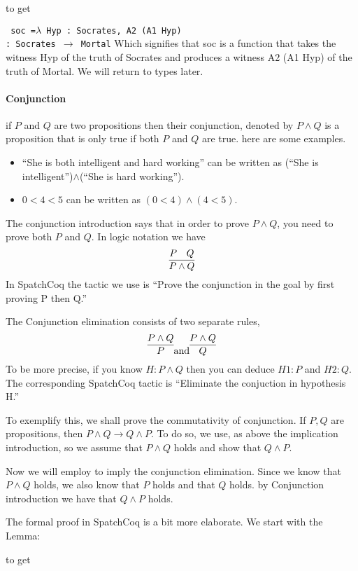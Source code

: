 to get 

\texttt{
soc =$ \lambda$ Hyp : Socrates, A2 (A1 Hyp) \\
     : Socrates $\rightarrow$ Mortal}
 Which signifies that soc is a function  that takes the witness Hyp of the truth of Socrates and produces a witness A2 (A1 Hyp) of the truth of Mortal.
 We will return to types later.



\paragraph{\bf Conjunction}
if $P$ and $Q$ are two propositions then their conjunction, denoted by $P\land Q$ is a proposition that is only true if both $P$ and $Q$ are true. here are some examples.

\begin{itemize}
\item ``She is both intelligent and hard working'' can be written as (``She is intelligent'')$\land$(``She is hard working'').
\item $0<4<5$ can be written as $(0<4)\land (4<5)$.
\end{itemize}


The conjunction introduction says that in order to prove $P\land Q$, you need to prove both $P$ and $Q$. In logic notation we have
$$\infer{P\land Q}{P & Q}$$
In SpatchCoq the tactic we use is ``Prove the conjunction in the goal by first proving P then Q.''

The Conjunction elimination consists of  two separate rules,
$$\infer{P}{P\land Q} \mbox{and} \infer{Q}{P\land Q}$$ To be more precise, if you know $H:P\land Q$ then you can deduce $H1:P$ and $H2:Q$. The corresponding SpatchCoq tactic is ``Eliminate the conjuction in hypothesis H.''

To exemplify this, we shall prove the commutativity of conjunction.
If $P,Q$ are propositions, then $P\land Q \rightarrow Q \land P$. To do so, we use, as above the implication introduction, so we assume that $P\land Q$ holds and show that $Q\land P$. 

Now we will employ to imply the conjunction elimination. Since we know that $P\land Q$ holds, we also know that $P$ holds and that $Q$ holds. by Conjunction introduction we have that $Q\land P$ holds.

The formal proof in SpatchCoq is a bit more elaborate. We start with the Lemma:

to get 

